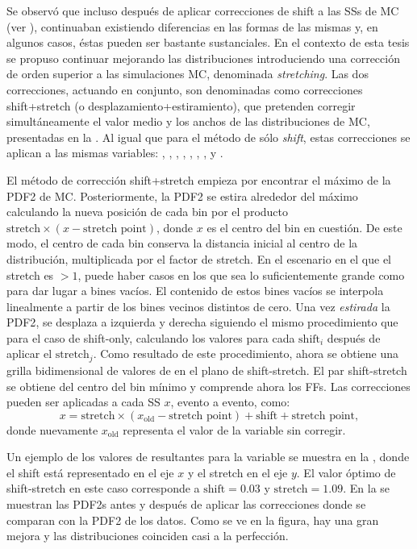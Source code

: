 Se observó que incluso después de aplicar correcciones de shift a las \acp{SS} de \ac{MC} (ver \Fig{\ref{fig:pid_ss:ss_differences:ss}}), continuaban existiendo diferencias en las formas de las mismas y, en algunos casos, éstas pueden ser bastante sustanciales. 
En el contexto de esta tesis se propuso continuar mejorando las distribuciones introduciendo una corrección de orden superior a las simulaciones \ac{MC}, denominada \textit{stretching}. Las dos correcciones, actuando en conjunto, son denominadas como correcciones shift+stretch (o desplazamiento+estiramiento), que pretenden corregir simultáneamente el valor medio y los anchos de las distribuciones de \ac{MC}, presentadas en la . Al igual que para el método de sólo \textit{shift}, estas correcciones se aplican a las mismas variables: \eratio, \fside, \reta, \rphi, \rhad, \rhado, \wone, \weta y \wstot.

El método de corrección shift+stretch empieza por encontrar el máximo de la \ac{PDF2} de \ac{MC}. Posteriormente, la \ac{PDF2} se estira alrededor del máximo calculando la nueva posición de cada bin por el producto \(\text{stretch}\times (x - \text{stretch point})\), donde \(x\) es el centro del bin en cuestión. De este modo, el centro de cada bin conserva la distancia inicial al centro de la distribución, multiplicada por el factor de stretch. En el escenario en el que el stretch es \(>1\), puede haber casos en los que sea lo suficientemente grande como para dar lugar a bines vacíos. El contenido de estos bines vacíos se interpola linealmente a partir de los bines vecinos distintos de cero.
Una vez \textit{estirada} la \ac{PDF2}, se desplaza a izquierda y derecha siguiendo el mismo procedimiento que para el caso de shift-only, calculando los valores \chisq para cada \(\text{shift}_i\) después de aplicar el \(\text{stretch}_j\). Como resultado de este procedimiento, ahora se obtiene una grilla bidimensional de valores de \chisq en el plano de shift-stretch. El par shift-stretch se obtiene del centro del bin mínimo y comprende ahora los \acp{FF}. Las correcciones pueden ser aplicadas a cada \ac{SS} \(x\), evento a evento, como:
\begin{equation}
	x = \text{stretch}\times(x_{\text{old}} - \text{stretch point}) + \text{shift} + \text{stretch point},
\end{equation}
donde nuevamente \(x_\text{old}\) representa el valor de la variable sin corregir.

Un ejemplo de los valores de \chisq resultantes para la variable \fside se muestra en la \Fig{\ref{fig:ss_corrections:ffs:calculation:fside_calculation:chi2}}, donde el shift está representado en el eje \(x\) y el stretch en el eje \(y\). El valor óptimo de shift-stretch en este caso corresponde a \(\text{shift}=0.03\) y \(\text{stretch}=1.09\). En la \Fig{\ref{fig:ss_corrections:ffs:calculation:fside_calculation:pdfs}} se muestran las \acp{PDF2} antes y después de aplicar las correcciones donde se comparan con la \ac{PDF2} de los datos. Como se ve en la figura, hay una gran mejora y las distribuciones coinciden casi a la perfección.

